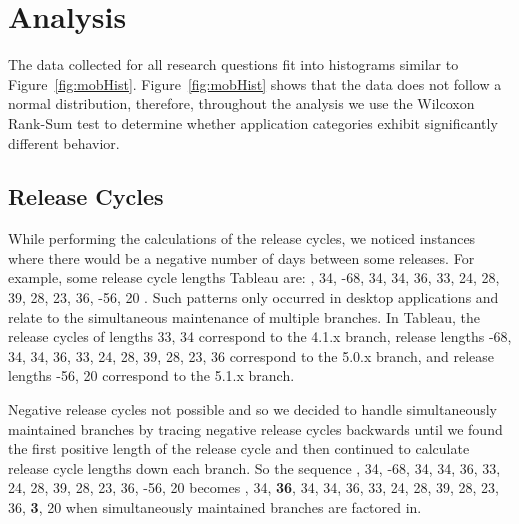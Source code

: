 \documentclass{acm_proc_article-sp}
\begin{document}
\section{Analysis}

The data collected for all research questions fit into histograms similar to Figure~\ref{fig:mobHist}. 
Figure~\ref{fig:mobHist} shows that the data does not follow a normal distribution, therefore, throughout the analysis we use the Wilcoxon Rank-Sum test to determine whether application categories exhibit significantly different behavior.



\subsection{Release Cycles}
While performing the calculations of the release cycles, we noticed instances where there would be a negative number of days between some releases.
For example, some release cycle lengths Tableau are: , 34, -68, 34, 34, 36, 33, 24, 28, 39, 28, 23, 36, -56, 20 \textellipsis\space . 
Such patterns only occurred in desktop applications and relate to the simultaneous maintenance of multiple branches. 
In Tableau, the release cycles of lengths 33, 34 correspond to the 4.1.x branch, release lengths -68, 34, 34, 36, 33, 24, 28, 39, 28, 23, 36 correspond to the 5.0.x branch, and release lengths -56, 20 correspond to the 5.1.x branch.

\begin{center}

\label{tab:sumcycles}
\end{center}

\begin{center}

\label{tab:cycles}
\end{center}

Negative release cycles not possible and so we decided to handle simultaneously maintained branches by tracing negative release cycles backwards until we found the first positive length of the release cycle and then continued to calculate release cycle lengths down each branch. 
So the sequence , 34, -68, 34, 34, 36, 33, 24, 28, 39, 28, 23, 36, -56, 20 \textellipsis becomes , 34, \textbf{36}, 34, 34, 36, 33, 24, 28, 39, 28, 23, 36, \textbf{3}, 20 \textellipsis when simultaneously maintained branches are factored in.
\end{document}

